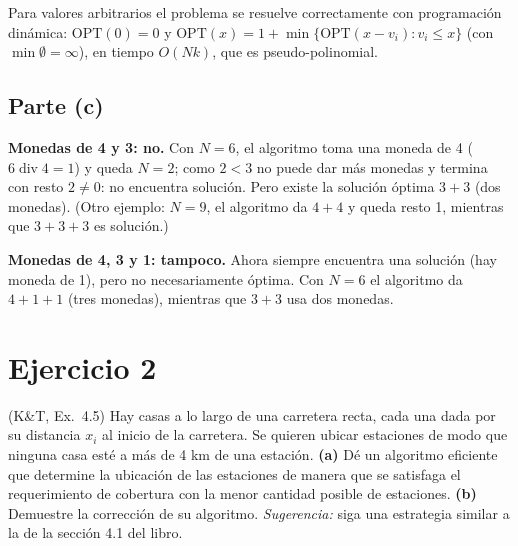 \begin{observacion}
Para valores arbitrarios el problema se resuelve correctamente con programación dinámica:
$\mathrm{OPT}(0)=0$ y $\mathrm{OPT}(x)=1+\min\{\mathrm{OPT}(x-v_i): v_i\le x\}$ (con
$\min\emptyset=\infty$), en tiempo $O(Nk)$, que es pseudo-polinomial.
\end{observacion}

\subsection*{Parte (c)}
\textbf{Monedas de 4 y 3: no.} Con $N=6$, el algoritmo toma una moneda de 4 ($6\operatorname{div}4=1$)
y queda $N=2$; como $2<3$ no puede dar más monedas y termina con resto $2\ne 0$: no encuentra
solución. Pero existe la solución óptima $3+3$ (dos monedas). (Otro ejemplo: $N=9$, el algoritmo
da $4+4$ y queda resto 1, mientras que $3+3+3$ es solución.)

\textbf{Monedas de 4, 3 y 1: tampoco.} Ahora siempre encuentra una solución (hay moneda de 1),
pero no necesariamente óptima. Con $N=6$ el algoritmo da $4+1+1$ (tres monedas), mientras que
$3+3$ usa dos monedas.

\section{Ejercicio 2}

\begin{enunciado}
(K\&T, Ex.~4.5) Hay casas a lo largo de una carretera recta, cada una dada por su distancia
$x_i$ al inicio de la carretera. Se quieren ubicar estaciones de modo que ninguna casa esté a más
de 4 km de una estación.
\textbf{(a)} Dé un algoritmo eficiente que determine la ubicación de las estaciones de manera que
se satisfaga el requerimiento de cobertura con la menor cantidad posible de estaciones.
\textbf{(b)} Demuestre la corrección de su algoritmo. \emph{Sugerencia:} siga una estrategia
similar a la de la sección 4.1 del libro.
\end{enunciado}


